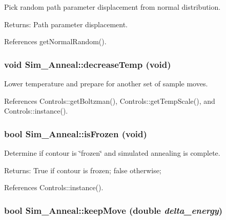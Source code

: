Pick random path parameter displacement from normal distribution. \begin{Desc}
\item[Returns:]Path parameter displacement. \end{Desc}


References getNormalRandom().\hypertarget{classSim__Anneal_6f78eb5ed1ed6e6addf5ffb1b4c7c428}{
\subsubsection[decreaseTemp]{\setlength{\rightskip}{0pt plus 5cm}void Sim\_\-Anneal::decreaseTemp (void)}}
\label{classSim__Anneal_6f78eb5ed1ed6e6addf5ffb1b4c7c428}


Lower temperature and prepare for another set of sample moves. 

References Controls::getBoltzman(), Controls::getTempScale(), and Controls::instance().\hypertarget{classSim__Anneal_75cbcb3507c613bfa0093886b216b7b4}{
\subsubsection[isFrozen]{\setlength{\rightskip}{0pt plus 5cm}bool Sim\_\-Anneal::isFrozen (void)}}
\label{classSim__Anneal_75cbcb3507c613bfa0093886b216b7b4}


Determine if contour is \char`\"{}frozen\char`\"{} and simulated annealing is complete. \begin{Desc}
\item[Returns:]True if contour is frozen; false otherwise; \end{Desc}


References Controls::instance().\hypertarget{classSim__Anneal_f2bb61f9a80a2e5227eb4002b8ccef09}{
\subsubsection[keepMove]{\setlength{\rightskip}{0pt plus 5cm}bool Sim\_\-Anneal::keepMove (double {\em delta\_\-energy})}}
\label{classSim__Anneal_f2bb61f9a80a2e5227eb4002b8ccef09}


